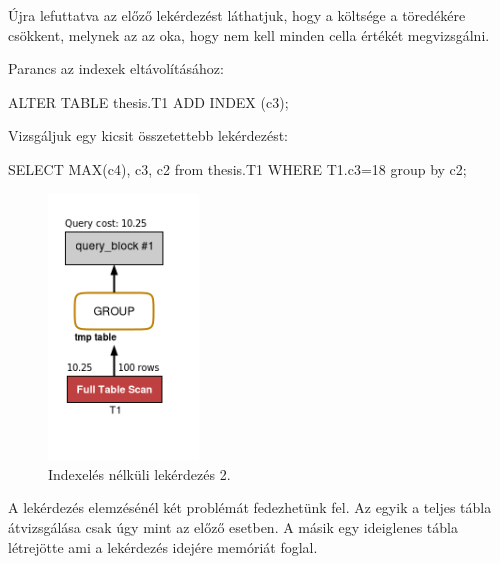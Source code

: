 Újra lefuttatva az előző lekérdezést láthatjuk, hogy a költsége a töredékére csökkent, melynek az az oka, hogy nem kell minden cella értékét megvizsgálni.

Parancs az indexek eltávolításához:
\begin{python} 
ALTER TABLE  thesis.T1  ADD INDEX (c3);
\end{python}

Vizsgáljuk egy kicsit összetettebb lekérdezést: 
\begin{python} 
SELECT MAX(c4), c3, c2 from thesis.T1 WHERE T1.c3=18  group by c2;
\end{python}

\begin{figure}[h!]
\centering
\includegraphics[width=4cm]{images/2-1.png}
\caption{Indexelés nélküli lekérdezés 2.}
\label{fig:schema}
\end{figure}

A lekérdezés elemzésénél két problémát fedezhetünk fel. Az egyik a teljes tábla átvizsgálása csak úgy mint az előző esetben. A másik egy ideiglenes tábla létrejötte ami a lekérdezés idejére memóriát foglal.

